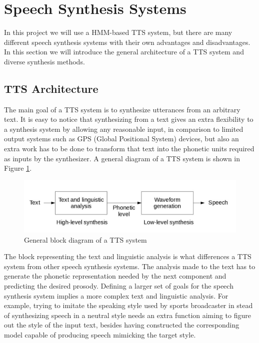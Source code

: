 \section{Speech Synthesis Systems}
\label{speec_synthesis_systems}
In this project we will use a HMM-based TTS system, but there are many different speech synthesis systems with their own advantages and disadvantages. In this section we will introduce the general architecture of a TTS system and diverse synthesis methods.

\subsection{TTS Architecture}
\label{speech_synthesis_systems_tts}
The main goal of a TTS system is to synthesize utterances from an arbitrary text. It is easy to notice that synthesizing from a text gives an extra flexibility to a synthesis system by allowing any reasonable input, in comparison to limited output systems such as GPS (Global Positional System) devices, but also an extra work has to be done to transform that text into the phonetic units required as inputs by the synthesizer. A general diagram of a TTS system is shown in Figure \ref{fig:tts_architecture}.

\begin{figure}[htb]
	\begin{center}
	\includegraphics[width=\textwidth]{images/tts_architecture.jpg}
	\caption{General block diagram of a TTS system \cite{TuomoMSc}}
	\label{fig:tts_architecture}
	\end{center}
\end{figure}

The block representing the text and linguistic analysis is what differences a TTS system from other speech synthesis systems. The analysis made to the text has to generate the phonetic representation needed by the next component and predicting the desired prosody. Defining a larger set of goals for the speech synthesis system implies a more complex text and linguistic analysis. For example, trying to imitate the speaking style used by sports broadcaster in stead of synthesizing speech in a neutral style needs an extra function aiming to figure out the style of the input text, besides having constructed the corresponding model capable of producing speech mimicking the target style.

